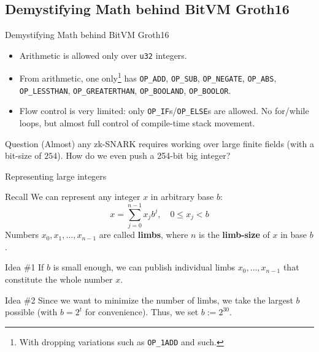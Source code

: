 \documentclass{zkdl-presentation-template}
\newcommand{\cmark}{\textcolor{green!65!black}{\ding{51}}}%
\begin{document}
    \subsection{Demystifying Math behind BitVM Groth16}
    
    \begin{frame}{Demystifying Math behind BitVM Groth16}
        \begin{itemize}[label=\cmark]
            \item Arithmetic is allowed only over \texttt{u32} integers.\pause
            \item From arithmetic, one only\footnote{With dropping variations such as \texttt{OP\_1ADD} and such.} has \texttt{OP\_ADD}, \texttt{OP\_SUB}, \texttt{OP\_NEGATE}, \texttt{OP\_ABS}, \texttt{OP\_LESSTHAN}, \texttt{OP\_GREATERTHAN}, \texttt{OP\_BOOLAND}, \texttt{OP\_BOOLOR}.\pause
            \item Flow control is very limited: only \texttt{OP\_IF}s/\texttt{OP\_ELSE}s are allowed. No for/while loops, but almost full control of compile-time stack movement.\pause
        \end{itemize}

        \begin{alertblock}{Question}
            (Almost) any zk-SNARK requires working over large finite fields (with a bit-size of $254$). How do we even push a 254-bit big integer?
        \end{alertblock}
    \end{frame}

    \begin{frame}{Representing large integers}
        \begin{block}{Recall}
            We can represent any integer $x$ in arbitrary base $b$:
            \begin{equation*}
                x = \sum_{j=0}^{n-1} x_jb^j, \quad 0 \leq x_j < b
            \end{equation*}
            \pause Numbers $x_0,x_1,\dots,x_{n-1}$ are called \textbf{limbs}, where $n$ is the \textbf{limb-size} of $x$ in base $b$.\pause
        \end{block}

        \begin{alertblock}{Idea \#1}
            If $b$ is small enough, we can publish individual limbs $x_0,\dots,x_{n-1}$ that constitute the whole number $x$.\pause
        \end{alertblock}

        \begin{alertblock}{Idea \#2}
            Since we want to minimize the number of limbs, we take the largest $b$ possible (with $b=2^t$ for convenience). Thus, we set $b := 2^{30}$.
        \end{alertblock}
    \end{frame}
\end{document}
